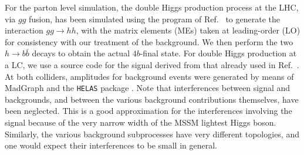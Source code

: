 For the parton level simulation, the double Higgs production process
at the LHC, via $gg$ fusion, has been simulated using the program
of Ref.~\cite{spira} to generate the interaction $gg \to hh$,
with the matrix elements (MEs) taken at leading-order (LO) for consistency
with our treatment of the background. We then
perform the two $h\to b\bar b$ decays to obtain the actual $4b$-final
state.  For double Higgs production at a LC, we use a source
code for the signal derived from that already used in Ref.~\cite{noi}. 
At both colliders,
amplitudes for background events were generated by means of MadGraph
\cite{tim} and the {\tt HELAS} package \cite{HELAS}. Note that
interferences between signal and backgrounds, and between the various
background contributions themselves, have been neglected.  This is a
good approximation for the interferences involving the signal because
of the very narrow width of the MSSM lightest Higgs boson.  Similarly,
the various background subprocesses have very different topologies,
and one would expect their interferences to be small in general.
 
